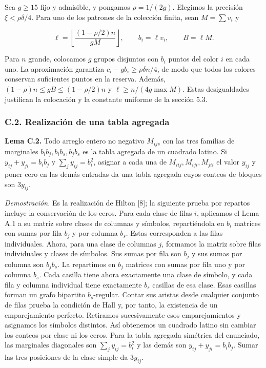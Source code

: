 \documentclass[spanish,11pt,a4paper]{article}
\begin{document}
Sea \(g\ge15\) fijo y admisible, y pongamos \(\rho=1/(2g)\). Elegimos la precisión \(\xi<\rho\delta/4\). Para uno de los patrones de la colección finita, sean \(M=\sum v_i\) y

\[\ell=\left\lfloor\frac{(1-\rho/2)n}{gM}\right\rfloor,\qquad b_i=\ell v_i,\qquad B=\ell M.\]

Para \(n\) grande, colocamos \(g\) grupos disjuntos con \(b_i\) puntos del color \(i\) en cada uno. La aproximación garantiza \(c_i-gb_i\ge\rho\delta n/4\), de modo que todos los colores conservan suficientes puntos en la reserva. Además, \((1-\rho)n\le gB\le(1-\rho/2)n\) y \(\ell\ge n/(4g\max M)\). Estas desigualdades justifican la colocación y la constante uniforme de la sección 5.3.

\subsubsection{C.2. Realización de una tabla agregada}\label{c.2.-realizaciuxf3n-de-una-tabla-agregada}

\textbf{Lema C.2.} Todo arreglo entero no negativo \(M_{ijs}\) con las tres familias de marginales \(b_ib_j,b_ib_s,b_jb_s\) es la tabla agregada de un cuadrado latino. Si \(y_{ij}+y_{ji}=b_ib_j\) y \(\sum_jy_{ij}=b_i^2\), asignar a cada una de \(M_{iij},M_{iji},M_{jii}\) el valor \(y_{ij}\) y poner cero en las demás entradas da una tabla agregada cuyos conteos de bloques son \(3y_{ij}\).

\emph{Demostración.} Es la realización de Hilton {[}8{]}; la siguiente prueba por repartos incluye la conservación de los ceros. Para cada clase de filas \(i\), aplicamos el Lema A.1 a su matriz sobre clases de columnas y símbolos, repartiéndola en \(b_i\) matrices con sumas por fila \(b_j\) y por columna \(b_s\). Estas corresponden a las filas individuales. Ahora, para una clase de columnas \(j\), formamos la matriz sobre filas individuales y clases de símbolos. Sus sumas por fila son \(b_j\) y sus sumas por columna son \(b_jb_s\). La repartimos en \(b_j\) matrices con sumas por fila uno y por columna \(b_s\). Cada casilla tiene ahora exactamente una clase de símbolo, y cada fila y columna individual tiene exactamente \(b_s\) casillas de esa clase. Esas casillas forman un grafo bipartito \(b_s\)-regular. Contar sus aristas desde cualquier conjunto de filas prueba la condición de Hall y, por tanto, la existencia de un emparejamiento perfecto. Retiramos sucesivamente esos emparejamientos y asignamos los símbolos distintos. Así obtenemos un cuadrado latino sin cambiar los conteos por clase ni los ceros. Para la tabla agregada simétrica del enunciado, las marginales diagonales son \(\sum_jy_{ij}=b_i^2\) y las demás son \(y_{ij}+y_{ji}=b_ib_j\). Sumar las tres posiciones de la clase simple da \(3y_{ij}\).
\end{document}
